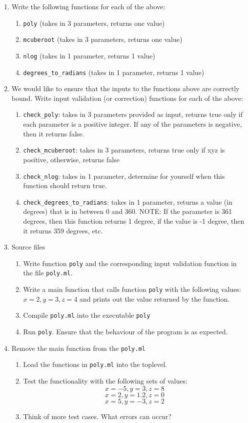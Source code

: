\documentclass{article}
\begin{document}
\begin{enumerate}
\item Write the following functions for each of the above:
	\begin{enumerate}
		\item {\tt poly} (takes in 3 parameters, returns one value)
		\item {\tt mcuberoot} (takes in 3 parameters, returns one value)
		\item {\tt nlog} (takes in 1 parameter, returns 1 value)
		\item {\tt degrees\_to\_radians} (takes in 1 parameter, returns 1 value)
	\end{enumerate}
\item We would like to ensure that the inputs to the functions above are correctly bound. Write input validation (or correction) functions for each of the above:
	\begin{enumerate}
		\item {\tt check\_poly}: takes in 3 parameters provided as input, returns true only if each parameter is a positive integer. If any of the parameters is negative, then it returns false.
		\item {\tt check\_mcuberoot}: takes in 3 parameters, returns true only if xyz is positive, otherwise, returns false
		\item {\tt check\_nlog}: takes in 1 parameter, determine for yourself when this function should return true.
		\item {\tt check\_degrees\_to\_radians}: takes in 1 parameter, returns a value (in degrees) that is in between 0 and 360. NOTE: If the parameter is 361 degrees, then this function returns 1 degree, if the value is -1 degree, then it returns 359 degrees, etc.
	\end{enumerate}
\item Source files
	\begin{enumerate}
		\item Write function {\tt poly} and the corresponding input validation function in the file {\tt poly.ml}.
		\item Write a main function that calls function {\tt poly} with the following values: $x = 2, y = 3, z = 4$ and prints out the value returned by the function.
		\item Compile {\tt poly.ml} into the executable {\tt poly}
		\item Run {\tt poly}. Ensure that the behaviour of the program is as expected.
	\end{enumerate}
\item Remove the main function from the {\tt poly.ml}
	\begin{enumerate}
		\item Load the functions in {\tt poly.ml} into the toplevel.
		\item Test the functionality with the following sets of values:
			$$x = -5, y = 3, z = 8$$
			$$x = 2, y = 1.2, z = 0$$
			$$x = 5, y = -3, z = 2$$
		\item Think of more test cases. What errors can occur?
	\end{enumerate}


\end{enumerate}
\end{document}
